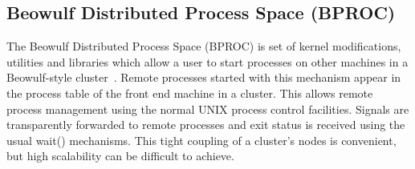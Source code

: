 %
%
%

\subsection*{Beowulf Distributed Process Space (BPROC)}

The Beowulf Distributed Process Space
(BPROC)
is set of kernel
modifications, utilities and libraries which allow a user to start
processes on other machines in a Beowulf-style cluster~\cite{BProc}.  Remote
processes started with this mechanism appear in the process table
of the front end machine in a cluster. This allows remote process
management using the normal UNIX process control facilities. Signals
are transparently forwarded to remote processes and exit status is
received using the usual wait() mechanisms. This tight coupling of
a cluster's nodes is convenient, but high scalability can be difficult
to achieve.

